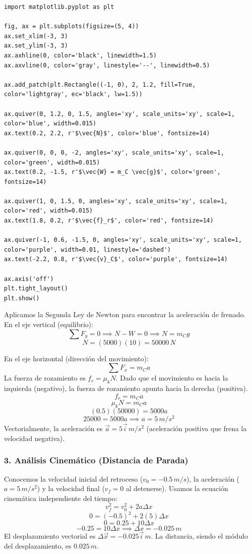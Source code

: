 \documentclass[12pt, a4paper]{article}
\begin{document}
\begin{lstlisting}
import matplotlib.pyplot as plt

fig, ax = plt.subplots(figsize=(5, 4))
ax.set_xlim(-3, 3)
ax.set_ylim(-3, 3)
ax.axhline(0, color='black', linewidth=1.5)
ax.axvline(0, color='gray', linestyle='--', linewidth=0.5)

ax.add_patch(plt.Rectangle((-1, 0), 2, 1.2, fill=True, color='lightgray', ec='black', lw=1.5))

ax.quiver(0, 1.2, 0, 1.5, angles='xy', scale_units='xy', scale=1, color='blue', width=0.015)
ax.text(0.2, 2.2, r'$\vec{N}$', color='blue', fontsize=14)

ax.quiver(0, 0, 0, -2, angles='xy', scale_units='xy', scale=1, color='green', width=0.015)
ax.text(0.2, -1.5, r'$\vec{W} = m_C \vec{g}$', color='green', fontsize=14)

ax.quiver(1, 0, 1.5, 0, angles='xy', scale_units='xy', scale=1, color='red', width=0.015)
ax.text(1.8, 0.2, r'$\vec{f}_r$', color='red', fontsize=14)

ax.quiver(-1, 0.6, -1.5, 0, angles='xy', scale_units='xy', scale=1, color='purple', width=0.01, linestyle='dashed')
ax.text(-2.2, 0.8, r'$\vec{v}_C$', color='purple', fontsize=14)

ax.axis('off')
plt.tight_layout()
plt.show()
\end{lstlisting}

Aplicamos la Segunda Ley de Newton para encontrar la aceleración de frenado.
En el eje vertical (equilibrio):
\[ \sum F_y = 0 \implies N - W = 0 \implies N = m_C g \]
\[ N = (5000)(10) = 50000 \, \si{N} \]

En el eje horizontal (dirección del movimiento):
\[ \sum F_x = m_C a \]
La fuerza de rozamiento es $f_r = \mu_k N$. Dado que el movimiento es hacia la izquierda (negativo), la fuerza de rozamiento apunta hacia la derecha (positiva).
\[ f_r = m_C a \]
\[ \mu_k N = m_C a \]
\[ (0.5)(50000) = 5000 a \]
\[ 25000 = 5000 a \implies a = 5 \, \si{m/s^2} \]
Vectorialmente, la aceleración es $\vec{a} = 5 \vec{i} \, \si{m/s^2}$ (aceleración positiva que frena la velocidad negativa).

\subsubsection*{3. Análisis Cinemático (Distancia de Parada)}
Conocemos la velocidad inicial del retroceso ($v_0 = -0.5 \, \si{m/s}$), la aceleración ($a = 5 \, \si{m/s^2}$) y la velocidad final ($v_f = 0$ al detenerse). Usamos la ecuación cinemática independiente del tiempo:
\[ v_f^2 = v_0^2 + 2a \Delta x \]
\[ 0 = (-0.5)^2 + 2(5) \Delta x \]
\[ 0 = 0.25 + 10 \Delta x \]
\[ -0.25 = 10 \Delta x \implies \Delta x = -0.025 \, \si{m} \]
El desplazamiento vectorial es $\Delta \vec{x} = -0.025 \vec{i} \, \si{m}$. La distancia, siendo el módulo del desplazamiento, es $0.025 \, \si{m}$.
\end{document}
